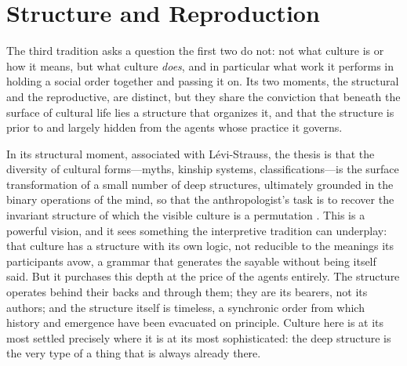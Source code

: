 \section{Structure and Reproduction}
\label{p24:sec:reproduction}

\noindent
The third tradition asks a question the first two do not: not what culture is or how it means, but what culture \emph{does}, and in particular what work it performs in holding a social order together and passing it on. Its two moments, the structural and the reproductive, are distinct, but they share the conviction that beneath the surface of cultural life lies a structure that organizes it, and that the structure is prior to and largely hidden from the agents whose practice it governs.

In its structural moment, associated with L\'evi-Strauss, the thesis is that the diversity of cultural forms---myths, kinship systems, classifications---is the surface transformation of a small number of deep structures, ultimately grounded in the binary operations of the mind, so that the anthropologist's task is to recover the invariant structure of which the visible culture is a permutation \parencite{levistrauss1963}. This is a powerful vision, and it sees something the interpretive tradition can underplay: that culture has a structure with its own logic, not reducible to the meanings its participants avow, a grammar that generates the sayable without being itself said. But it purchases this depth at the price of the agents entirely. The structure operates behind their backs and through them; they are its bearers, not its authors; and the structure itself is timeless, a synchronic order from which history and emergence have been evacuated on principle. Culture here is at its most settled precisely where it is at its most sophisticated: the deep structure is the very type of a thing that is always already there.

